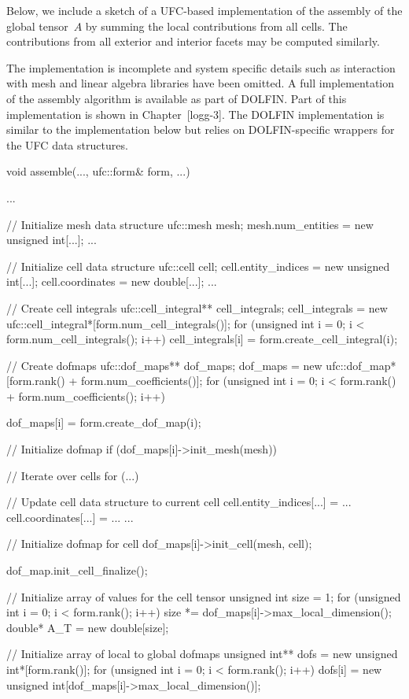 Below, we include a sketch of a UFC-based implementation of the
assembly of the global tensor~$A$ by summing the local contributions
from all cells. The contributions from all exterior and interior
facets may be computed similarly.

The implementation is incomplete and system specific details such as
interaction with mesh and linear algebra libraries have been
omitted. A full implementation of the assembly algorithm is available
as part of DOLFIN. Part of this implementation is shown in
Chapter~[logg-3]. The DOLFIN implementation is similar to the
implementation below but relies on DOLFIN-specific wrappers for the
UFC data structures.

\scriptsize
\begin{code}
void assemble(..., ufc::form& form, ...)
{
  ...

  // Initialize mesh data structure
  ufc::mesh mesh;
  mesh.num_entities = new unsigned int[...];
  ...

  // Initialize cell data structure
  ufc::cell cell;
  cell.entity_indices = new unsigned int[...];
  cell.coordinates = new double[...];
  ...

  // Create cell integrals
  ufc::cell_integral** cell_integrals;
  cell_integrals = new ufc::cell_integral*[form.num_cell_integrals()];
  for (unsigned int i = 0; i < form.num_cell_integrals(); i++)
    cell_integrals[i] = form.create_cell_integral(i);

  // Create dofmaps
  ufc::dof_maps** dof_maps;
  dof_maps = new ufc::dof_map*[form.rank() + form.num_coefficients()];
  for (unsigned int i = 0; i < form.rank() + form.num_coefficients(); i++)
  {
    dof_maps[i] = form.create_dof_map(i);

    // Initialize dofmap
    if (dof_maps[i]->init_mesh(mesh))
    {
      // Iterate over cells
      for (...)
      {
        // Update cell data structure to current cell
        cell.entity_indices[...] = ...
        cell.coordinates[...] = ...
        ...

        // Initialize dofmap for cell
        dof_maps[i]->init_cell(mesh, cell);
      }

      dof_map.init_cell_finalize();
    }
  }

  // Initialize array of values for the cell tensor
  unsigned int size = 1;
  for (unsigned int i = 0; i < form.rank(); i++)
    size *= dof_maps[i]->max_local_dimension();
  double* A_T = new double[size];

  // Initialize array of local to global dofmaps
  unsigned int** dofs = new unsigned int*[form.rank()];
  for (unsigned int i = 0; i < form.rank(); i++)
    dofs[i] = new unsigned int[dof_maps[i]->max_local_dimension()];

}
\end{code}
